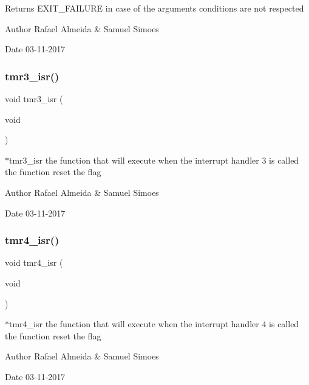 \begin{DoxyReturn}{Returns}
E\+X\+I\+T\+\_\+\+F\+A\+I\+L\+U\+RE in case of the argument\textquotesingle{}s conditions are not respected 
\end{DoxyReturn}
\begin{DoxyAuthor}{Author}
Rafael Almeida \& Samuel Simoes 
\end{DoxyAuthor}
\begin{DoxyDate}{Date}
03-\/11-\/2017 
\end{DoxyDate}
\mbox{\label{_timer__libs_8c_adaa8fed7e9977936c99b1989d3aac195}} 
\subsubsection{tmr3\+\_\+isr()}
{\footnotesize\ttfamily void tmr3\+\_\+isr (\begin{DoxyParamCaption}\item[{void}]{ }\end{DoxyParamCaption})}



$\ast$tmr3\+\_\+isr the function that will execute when the interrupt handler 3 is called the function reset the flag 

\begin{DoxyAuthor}{Author}
Rafael Almeida \& Samuel Simoes 
\end{DoxyAuthor}
\begin{DoxyDate}{Date}
03-\/11-\/2017 
\end{DoxyDate}
\mbox{\label{_timer__libs_8c_aeb91f903b0c92b3f81dc57f7e63f45aa}} 
\subsubsection{tmr4\+\_\+isr()}
{\footnotesize\ttfamily void tmr4\+\_\+isr (\begin{DoxyParamCaption}\item[{void}]{ }\end{DoxyParamCaption})}



$\ast$tmr4\+\_\+isr the function that will execute when the interrupt handler 4 is called the function reset the flag 

\begin{DoxyAuthor}{Author}
Rafael Almeida \& Samuel Simoes 
\end{DoxyAuthor}
\begin{DoxyDate}{Date}
03-\/11-\/2017 
\end{DoxyDate}
\mbox{\label{_timer__libs_8c_ae868a352a2c5a724c8ac9cf5054ad78c}} 
